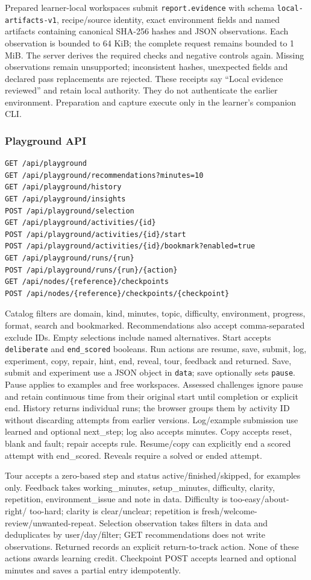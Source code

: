 Prepared learner-local workspaces submit \texttt{report.evidence} with schema
\texttt{local-artifacts-v1}, recipe/source identity, exact environment fields
and named artifacts containing canonical SHA-256 hashes and JSON observations.
Each observation is bounded to 64 KiB; the complete request remains bounded to
1 MiB. The server derives the required checks and negative controls again.
Missing observations remain unsupported; inconsistent hashes, unexpected fields
and declared pass replacements are rejected. These receipts say ``Local evidence
reviewed'' and retain local authority. They do not authenticate the earlier
environment. Preparation and capture execute only in the learner's companion CLI.

\subsubsection{Playground API}
\begin{verbatim}
GET /api/playground
GET /api/playground/recommendations?minutes=10
GET /api/playground/history
GET /api/playground/insights
POST /api/playground/selection
GET /api/playground/activities/{id}
POST /api/playground/activities/{id}/start
POST /api/playground/activities/{id}/bookmark?enabled=true
GET /api/playground/runs/{run}
POST /api/playground/runs/{run}/{action}
GET /api/nodes/{reference}/checkpoints
POST /api/nodes/{reference}/checkpoints/{checkpoint}
\end{verbatim}
Catalog filters are domain, kind, minutes, topic, difficulty, environment, progress,
format, search and bookmarked. Recommendations also accept comma-separated
exclude IDs. Empty selections include named alternatives. Start accepts
\texttt{deliberate} and \texttt{end\_scored} booleans. Run actions are resume,
save, submit, log, experiment, copy, repair, hint, end, reveal, tour, feedback and
returned. Save, submit and
experiment use a JSON object in \texttt{data}; save optionally sets \texttt{pause}.
Pause applies to examples and free workspaces. Assessed challenges ignore pause
and retain continuous time from their original start until completion or explicit
end. History returns individual runs; the browser groups them by activity ID
without discarding attempts from earlier versions.
Log/example submission use learned and optional next\_step; log also accepts minutes.
Copy accepts reset, blank and fault; repair accepts rule. Resume/copy can explicitly
end a scored attempt with end\_scored. Reveals require a solved or ended attempt.

Tour accepts a zero-based step and status active/finished/skipped, for examples
only. Feedback takes working\_minutes, setup\_minutes, difficulty, clarity,
repetition, environment\_issue and note in data. Difficulty is too-easy/about-right/
too-hard; clarity is clear/unclear; repetition is fresh/welcome-review/unwanted-repeat.
Selection observation takes filters in data and deduplicates by user/day/filter;
GET recommendations does not write observations. Returned records an explicit
return-to-track action. None of these actions awards learning credit. Checkpoint
POST accepts learned and optional minutes and saves a partial entry idempotently.

